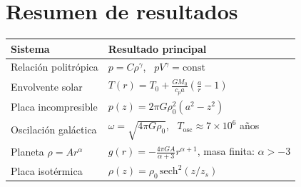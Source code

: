 \figuraComparacionPlacas

\section{Resumen de resultados}

\begin{center}
\renewcommand{\arraystretch}{1.6}
\begin{tabular}{|l|l|}
\hline
\textbf{Sistema} & \textbf{Resultado principal} \\
\hline
Relación politrópica & $p = C\rho^{\gamma}$, \ $pV^{\gamma} = \text{const}$ \\
\hline
Envolvente solar & $T(r) = T_0 + \frac{GM_0}{c_p a}\left(\frac{a}{r}-1\right)$ \\
\hline
Placa incompresible & $p(z) = 2\pi G\rho_0^2(a^2 - z^2)$ \\
\hline
Oscilación galáctica & $\omega = \sqrt{4\pi G\rho_0}$, \ $T_{\text{osc}} \approx 7\times 10^6$ años \\
\hline
Planeta $\rho = Ar^{\alpha}$ & $g(r) = -\frac{4\pi GA}{\alpha+3}r^{\alpha+1}$, masa finita: $\alpha > -3$ \\
\hline
Placa isotérmica & $\rho(z) = \rho_0\,\text{sech}^2(z/z_s)$ \\
\hline
\end{tabular}
\end{center}
